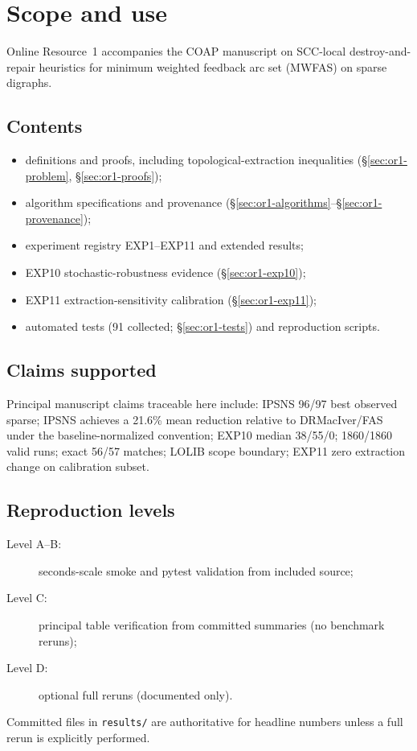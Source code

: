 \section{Scope and use}
\label{sec:or1-purpose}

Online Resource~1 accompanies the COAP manuscript on SCC-local destroy-and-repair heuristics for minimum weighted feedback arc set (MWFAS) on sparse digraphs.

\subsection{Contents}

\begin{itemize}
  \item definitions and proofs, including topological-extraction inequalities (\S\ref{sec:or1-problem}, \S\ref{sec:or1-proofs});
  \item algorithm specifications and provenance (\S\ref{sec:or1-algorithms}--\S\ref{sec:or1-provenance});
  \item experiment registry EXP1--EXP11 and extended results;
  \item EXP10 stochastic-robustness evidence (\S\ref{sec:or1-exp10});
  \item EXP11 extraction-sensitivity calibration (\S\ref{sec:or1-exp11});
  \item automated tests (91 collected; \S\ref{sec:or1-tests}) and reproduction scripts.
\end{itemize}

\subsection{Claims supported}

Principal manuscript claims traceable here include: IPSNS 96/97 best observed sparse; IPSNS achieves a 21.6\% mean reduction relative to DRMacIver/FAS under the baseline-normalized convention; EXP10 median 38/55/0; 1860/1860 valid runs; exact 56/57 matches; LOLIB scope boundary; EXP11 zero extraction change on calibration subset.

\subsection{Reproduction levels}

\begin{description}
  \item[Level A--B:] seconds-scale smoke and pytest validation from included source;
  \item[Level C:] principal table verification from committed summaries (no benchmark reruns);
  \item[Level D:] optional full reruns (documented only).
\end{description}

Committed files in \texttt{results/} are authoritative for headline numbers unless a full rerun is explicitly performed.
